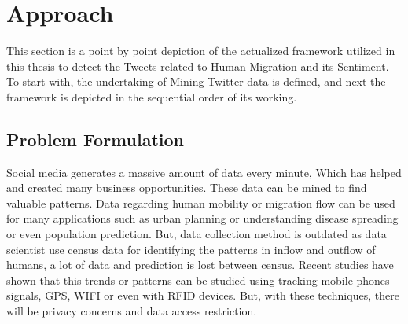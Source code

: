 \chapter{Approach}\label{chap:approach}
This section is a point by point depiction of the actualized framework utilized in this thesis to detect the Tweets related to Human Migration  and its Sentiment. To start with, the undertaking of Mining Twitter data is defined, and next the framework is depicted in the sequential order of its working.

\section{Problem Formulation}

Social media generates a massive amount of data every minute, Which has helped and created 
many business opportunities. These data can be mined to find valuable patterns. Data regarding human mobility or migration flow can be used for many applications such as urban planning 
or understanding disease spreading or even population prediction. But, data collection method
 is outdated as data scientist use census data for identifying the patterns in inflow and outflow 
of humans, a lot of data and prediction is lost between census. Recent studies have shown that
this trends or patterns can be studied using tracking mobile phones signals, GPS, WIFI or even
with RFID devices. But, with these techniques, there will be privacy concerns and data access 
restriction. 
